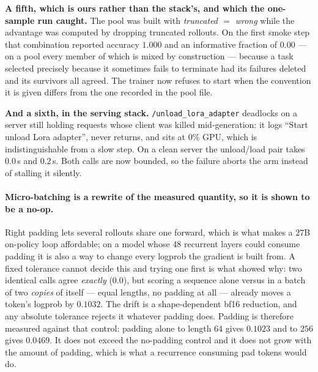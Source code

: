 \textbf{A fifth, which is ours rather than the stack's, and which the one-sample run caught.}
The pool was built with \emph{truncated $=$ wrong} while the advantage was computed by
dropping truncated rollouts. On the first smoke step that combination reported accuracy
$1.000$ and an informative fraction of $0.00$ --- on a pool every member of which is mixed by
construction --- because a task selected precisely because it sometimes fails to terminate had
its failures deleted and its survivors all agreed. The trainer now refuses to start when the
convention it is given differs from the one recorded in the pool file.

\textbf{And a sixth, in the serving stack.} \texttt{/unload\_lora\_adapter} deadlocks on a
server still holding requests whose client was killed mid-generation: it logs ``Start unload
Lora adapter'', never returns, and sits at $0\%$ GPU, which is indistinguishable from a slow
step. On a clean server the unload/load pair takes $0.0$\,s and $0.2$\,s. Both calls are now
bounded, so the failure aborts the arm instead of stalling it silently.

\paragraph{Micro-batching is a rewrite of the measured quantity, so it is shown to be a
no-op.} Right padding lets several rollouts share one forward, which is what makes a $27$B
on-policy loop affordable; on a model whose 48 recurrent layers could consume padding it is
also a way to change every logprob the gradient is built from. A fixed tolerance cannot decide
this and trying one first is what showed why: two identical calls agree \emph{exactly}
($0.0$), but scoring a sequence alone versus in a batch of two \emph{copies} of itself --- equal
lengths, no padding at all --- already moves a token's logprob by $0.1032$. The drift is a
shape-dependent bf16 reduction, and any absolute tolerance rejects it whatever padding does.
Padding is therefore measured against that control: padding alone to length $64$ gives
$0.1023$ and to $256$ gives $0.0469$. It does not exceed the no-padding control and it does not
grow with the amount of padding, which is what a recurrence consuming pad tokens would do.

